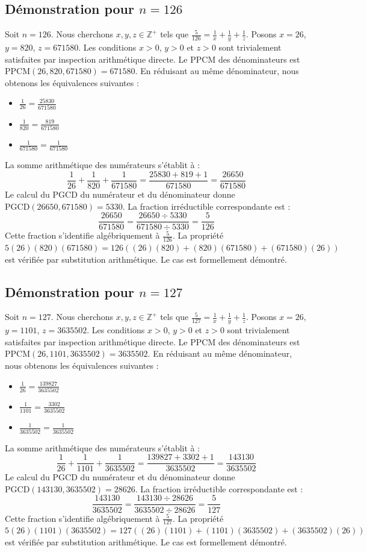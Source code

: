 \documentclass[12pt,a4paper]{article}
\begin{document}
\subsection{Démonstration pour $n = 126$}
Soit $n = 126$. Nous cherchons $x, y, z \in \mathbb{Z}^{+}$ tels que $\frac{5}{126} = \frac{1}{x} + \frac{1}{y} + \frac{1}{z}$.
Posons $x = 26$, $y = 820$, $z = 671580$.
Les conditions $x > 0$, $y > 0$ et $z > 0$ sont trivialement satisfaites par inspection arithmétique directe.
Le PPCM des dénominateurs est $\text{PPCM}(26, 820, 671580) = 671580$.
En réduisant au même dénominateur, nous obtenons les équivalences suivantes :
\begin{itemize}
    \item $\frac{1}{26} = \frac{25830}{671580}$
    \item $\frac{1}{820} = \frac{819}{671580}$
    \item $\frac{1}{671580} = \frac{1}{671580}$
\end{itemize}
La somme arithmétique des numérateurs s'établit à :
$$ \frac{1}{26} + \frac{1}{820} + \frac{1}{671580} = \frac{25830 + 819 + 1}{671580} = \frac{26650}{671580} $$
Le calcul du PGCD du numérateur et du dénominateur donne $\text{PGCD}(26650, 671580) = 5330$.
La fraction irréductible correspondante est :
$$ \frac{26650}{671580} = \frac{26650 \div 5330}{671580 \div 5330} = \frac{5}{126} $$
Cette fraction s'identifie algébriquement à $\frac{5}{126}$.
La propriété $5(26)(820)(671580) = 126((26)(820) + (820)(671580) + (671580)(26))$ est vérifiée par substitution arithmétique.
Le cas est formellement démontré.

\subsection{Démonstration pour $n = 127$}
Soit $n = 127$. Nous cherchons $x, y, z \in \mathbb{Z}^{+}$ tels que $\frac{5}{127} = \frac{1}{x} + \frac{1}{y} + \frac{1}{z}$.
Posons $x = 26$, $y = 1101$, $z = 3635502$.
Les conditions $x > 0$, $y > 0$ et $z > 0$ sont trivialement satisfaites par inspection arithmétique directe.
Le PPCM des dénominateurs est $\text{PPCM}(26, 1101, 3635502) = 3635502$.
En réduisant au même dénominateur, nous obtenons les équivalences suivantes :
\begin{itemize}
    \item $\frac{1}{26} = \frac{139827}{3635502}$
    \item $\frac{1}{1101} = \frac{3302}{3635502}$
    \item $\frac{1}{3635502} = \frac{1}{3635502}$
\end{itemize}
La somme arithmétique des numérateurs s'établit à :
$$ \frac{1}{26} + \frac{1}{1101} + \frac{1}{3635502} = \frac{139827 + 3302 + 1}{3635502} = \frac{143130}{3635502} $$
Le calcul du PGCD du numérateur et du dénominateur donne $\text{PGCD}(143130, 3635502) = 28626$.
La fraction irréductible correspondante est :
$$ \frac{143130}{3635502} = \frac{143130 \div 28626}{3635502 \div 28626} = \frac{5}{127} $$
Cette fraction s'identifie algébriquement à $\frac{5}{127}$.
La propriété $5(26)(1101)(3635502) = 127((26)(1101) + (1101)(3635502) + (3635502)(26))$ est vérifiée par substitution arithmétique.
Le cas est formellement démontré.
\end{document}
